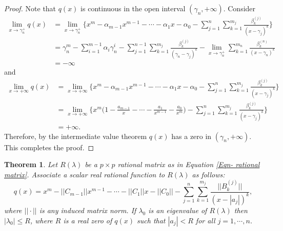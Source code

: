 \documentclass[12pt, reqno]{amsart}
\newtheorem{theorem}{Theorem}[section]
\theoremstyle{definition}
\theoremstyle{remark}
\numberwithin{equation}{section}
\begin{document}
\begin{proof}
Note that $q(x)$ is continuous in the open interval $(\gamma_n, + \infty)$. Consider
\begin{align*}
\displaystyle \lim_{x \rightarrow \gamma_n^+}q(x) & = \displaystyle 
\lim_{x \rightarrow \gamma_n^+}\Bigg\{ x^m-\alpha_{m-1}x^{m-1}-\cdots - 
\alpha_1 x - \alpha_0 - \displaystyle 
\sum_{j=1}^{n} \sum_{k=1}^{m_j} \frac{\beta_k^{(j)}}{(x-\gamma_j)^k} \Bigg\}\\
& = \gamma_n^m- \sum_{i=1}^{m-1} \alpha_{i}\gamma_n^{i}-\displaystyle 
\sum_{j=1}^{n-1} \sum_{k=1}^{m_j} \frac{\beta_k^{(j)}}{(\gamma_n-\gamma_j)^k} - 
\displaystyle \lim_{x \rightarrow \gamma_n^+} \sum_{k=1}^{m_n} 
\frac{\beta_k^{(n)}}{(x-\gamma_n)^k} \\
& = - \infty
\end{align*} 
and 
\begin{align*}
\displaystyle 
\lim_{x \rightarrow + \infty} q(x) & = \displaystyle \lim_{x \rightarrow +
\infty}\Bigg\{ x^m-\alpha_{m-1}x^{m-1}-\cdots - \alpha_1 x - \alpha_0 - \displaystyle 
\sum_{j=1}^{n} \sum_{k=1}^{m_j} \frac{\beta_k^{(j)}}{(x-\gamma_j)^k} \Bigg\}\\
& = \displaystyle \lim_{x \rightarrow +\infty} \Bigg \{x^m \bigg( 1-\frac{a_{m-1}}{x} 
- \cdots -\frac{a_{1}}{x^{m-1}} -\frac{a_{0}}{x^m}\bigg) - \displaystyle 
\sum_{j=1}^{n} \sum_{k=1}^{m_j} \frac{\beta_k^{(j)}}{(x-\gamma_j)^k} \Bigg\} \\
& = +\infty.
\end{align*}
Therefore, by the intermediate value theorem $q(x)$ has a zero in $(\gamma_n, + \infty)$. 
This completes the proof.
\end{proof}

\medskip

\begin{theorem}\label{Thm-eigenvalue bounds-matrix rational function}
Let $R(\lambda)$ be a $p \times p$ rational matrix as in Equation 
\eqref{Eqn- rational matrix}. Associate a scalar real rational function to 
$R(\lambda)$ as follows:
\begin{equation}\label{Eqn-associated rational function}
q(x) = x^m-||C_{m-1}||x^{m-1}-\cdots - ||C_1|| x - ||C_0|| - \displaystyle 
\sum_{j=1}^{n} \sum_{k=1}^{m_j} \frac{||B_k^{(j)}||}{(x- |a_j|)^k},
\end{equation}
where $||\cdot ||$ is any induced matrix norm. If $\lambda_0$ is an eigenvalue of 
$R(\lambda)$ then $|\lambda_0| \leq R$, where $R$ is a real zero of $q(x)$ such that 
$|a_j| < R$ for all $j=1,\cdots,n$.
\end{theorem}
\end{document}
